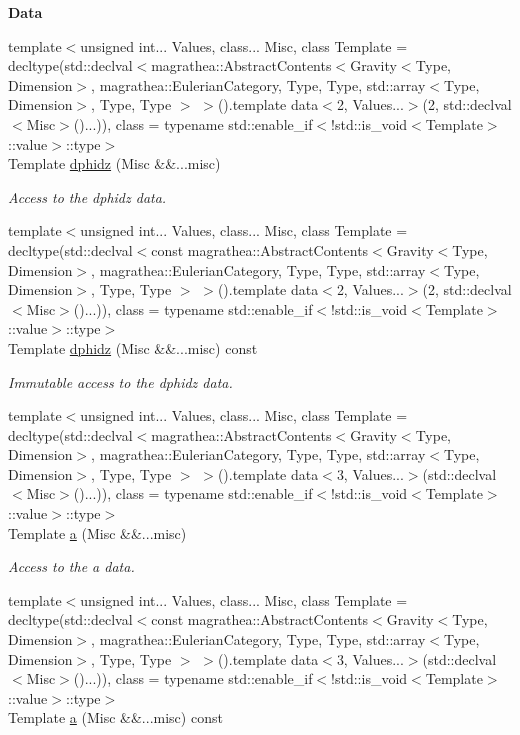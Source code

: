 \begin{Indent}{\bf Data}
\begin{DoxyCompactItemize}
{\footnotesize template$<$unsigned int... Values, class... Misc, class Template  = decltype(std\-::declval$<$magrathea\-::\-Abstract\-Contents$<$\-Gravity$<$\-Type, Dimension$>$, magrathea\-::\-Eulerian\-Category, Type, Type, std\-::array$<$\-Type, Dimension$>$, Type, Type $>$ $>$().\-template data$<$2, Values...$>$(2, std\-::declval$<$\-Misc$>$()...)), class  = typename std\-::enable\-\_\-if$<$!std\-::is\-\_\-void$<$\-Template$>$\-::value$>$\-::type$>$ }\\Template \hyperlink{exceptionGravity_a32e15efbb775e2628f5725ebe5aeee1a}{dphidz} (Misc \&\&...misc)
\begin{DoxyCompactList}\small\item\em Access to the dphidz data. \end{DoxyCompactList}\item 
{\footnotesize template$<$unsigned int... Values, class... Misc, class Template  = decltype(std\-::declval$<$const magrathea\-::\-Abstract\-Contents$<$\-Gravity$<$\-Type, Dimension$>$, magrathea\-::\-Eulerian\-Category, Type, Type, std\-::array$<$\-Type, Dimension$>$, Type, Type $>$ $>$().\-template data$<$2, Values...$>$(2, std\-::declval$<$\-Misc$>$()...)), class  = typename std\-::enable\-\_\-if$<$!std\-::is\-\_\-void$<$\-Template$>$\-::value$>$\-::type$>$ }\\Template \hyperlink{exceptionGravity_a0f35a078d6741e273b982dad0bcb6934}{dphidz} (Misc \&\&...misc) const 
\begin{DoxyCompactList}\small\item\em Immutable access to the dphidz data. \end{DoxyCompactList}\item 
{\footnotesize template$<$unsigned int... Values, class... Misc, class Template  = decltype(std\-::declval$<$magrathea\-::\-Abstract\-Contents$<$\-Gravity$<$\-Type, Dimension$>$, magrathea\-::\-Eulerian\-Category, Type, Type, std\-::array$<$\-Type, Dimension$>$, Type, Type $>$ $>$().\-template data$<$3, Values...$>$(std\-::declval$<$\-Misc$>$()...)), class  = typename std\-::enable\-\_\-if$<$!std\-::is\-\_\-void$<$\-Template$>$\-::value$>$\-::type$>$ }\\Template \hyperlink{exceptionGravity_ad037d5e27a7a8406a038a1e9938db264}{a} (Misc \&\&...misc)
\begin{DoxyCompactList}\small\item\em Access to the a data. \end{DoxyCompactList}\item 
{\footnotesize template$<$unsigned int... Values, class... Misc, class Template  = decltype(std\-::declval$<$const magrathea\-::\-Abstract\-Contents$<$\-Gravity$<$\-Type, Dimension$>$, magrathea\-::\-Eulerian\-Category, Type, Type, std\-::array$<$\-Type, Dimension$>$, Type, Type $>$ $>$().\-template data$<$3, Values...$>$(std\-::declval$<$\-Misc$>$()...)), class  = typename std\-::enable\-\_\-if$<$!std\-::is\-\_\-void$<$\-Template$>$\-::value$>$\-::type$>$ }\\Template \hyperlink{exceptionGravity_a9e897f71820d3078589ea9738129a297}{a} (Misc \&\&...misc) const 

\end{DoxyCompactItemize}
\end{Indent}
